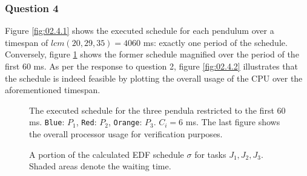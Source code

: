 \subsubsection{Question 4}

Figure \ref{fig:02.4.1} shows the executed schedule for each pendulum over a
timespan of $lcm(20,29,35) = 4060$ ms: exactly one period of the schedule.
Conversely, figure \ref{fig:02.4.1.small} shows the former schedule magnified
over the period of the first 60 ms.
As per the response to question 2, figure \ref{fig:02.4.2} illustrates that the
schedule is indeed feasible by plotting the overall usage of the CPU over the
aforementioned timespan.


\begin{sidewaysfigure}

  \begin{figure}[H]\centering
    \scalebox{1}{}
    \caption{The executed schedule for the three pendula restricted to the first
        60 ms. \texttt{Blue}: $P_1$, \texttt{Red}: $P_2$,
        \texttt{Orange}: $P_3$. $C_i = 6$ ms. The last figure shows the overall
      processor usage for verification purposes.}
    \label{fig:02.4.1.small}
  \end{figure}

  \begin{figure}[H]\centering
    \scalebox{0.7}{}
    \caption{A portion of the calculated EDF schedule $\sigma$ for tasks
      $J_1, J_2, J_3$. Shaded areas denote the waiting time.}
    \label{fig:edf_6}
  \end{figure}

\end{sidewaysfigure}

\noindent{}
